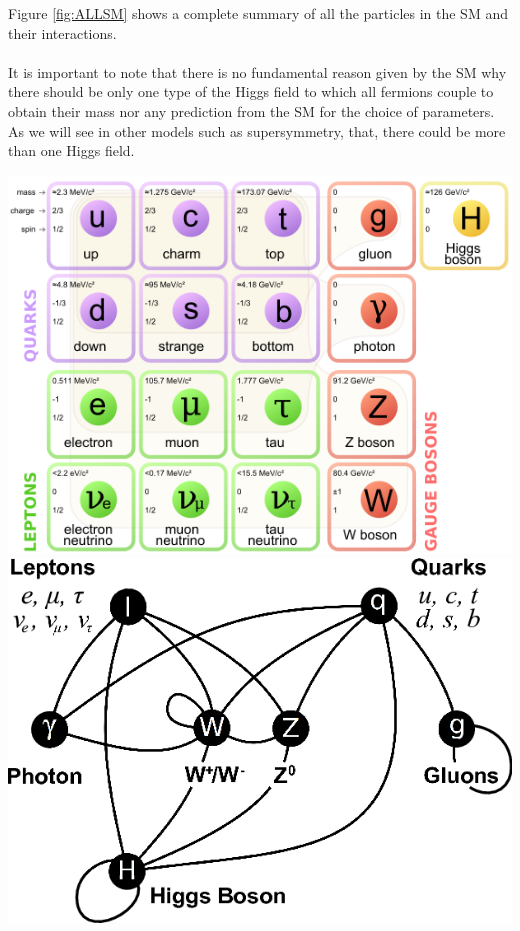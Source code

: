 Figure \ref{fig:ALLSM} shows a complete summary of all the particles in the SM and their interactions.

\paragraph*{}
It is important to note that there is no fundamental reason given by the SM why there should be only one type of the Higgs field to which all fermions couple to obtain their mass nor any prediction from the SM for the choice of parameters. As we will see in other models such as supersymmetry, that, there could be more than one Higgs field.

\begin{center}
\centering
\includegraphics[scale=0.5]{THESISPLOTS/Standard_Model_of_Elementary_Particles.png} 
\quad
\includegraphics[scale=0.5]{THESISPLOTS/SM_Particles.png}%
\label{fig:ALLSM}
\end{center}


